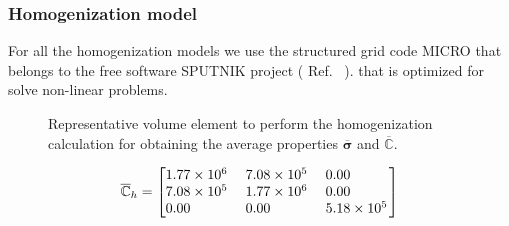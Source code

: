\documentclass[review]{elsarticle}
\newcommand{\sputnik}{{\ttfamily \fontseries{b}\selectfont SPUTNIK }}
\newcommand{\micro}{{\ttfamily \fontseries{b}\selectfont MICRO }}
\begin{document}
\subsubsection{Homogenization model}

For all the homogenization models we use the structured grid code \micro that belongs to the 
free software \sputnik project ( Ref.~\cite{sputnik} ).
that is optimized for solve non-linear problems.

\begin{figure}[!ht]
\centering
{}
\caption{Representative volume element to perform the homogenization calculation for obtaining the 
average properties $\overline{\bm{\sigma}}$ and $\overline{\mathbb{C}}$.}
\label{fig_rve_front_fib}
\end{figure}

\begin{equation}
\overline{\mathbb{C}}_h = 
  \begin{bmatrix}
   \begin{tabular}{ @{}*{3}{S[round-mode=places,
                    round-integer-to-decimal,round-precision=2,
                    table-format=1.2e4,table-column-width=16mm,table-number-alignment=center]}@{}
		  }
    1.7722e+06 & 7.08e+05 & 0.0\\
    7.08e+05 & 1.77e+06 & 0.0\\
    0.0          & 0.0  & 5.18e+05
   \end{tabular}
  \end{bmatrix}
\end{equation}
\end{document}
